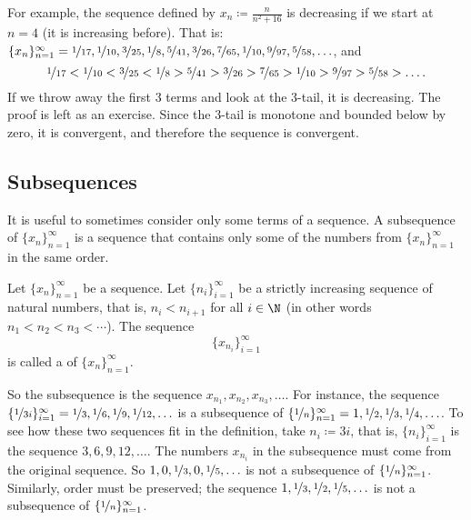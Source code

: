 For example, the sequence defined by $x_n \coloneqq \frac{n}{n^2+16}$ is decreasing
if we start at $n=4$ (it is increasing before).  That is:
$\{ x_n \}_{n=1}^\infty =
\nicefrac{1}{17},
\nicefrac{1}{10},
\nicefrac{3}{25},
\nicefrac{1}{8},
\nicefrac{5}{41},
\nicefrac{3}{26},
\nicefrac{7}{65},
\nicefrac{1}{10},
\nicefrac{9}{97},
\nicefrac{5}{58},\ldots$, and 
\begin{equation*}
\nicefrac{1}{17} <
\nicefrac{1}{10} <
\nicefrac{3}{25} <
\nicefrac{1}{8} >
\nicefrac{5}{41} >
\nicefrac{3}{26} >
\nicefrac{7}{65} >
\nicefrac{1}{10} >
\nicefrac{9}{97} >
\nicefrac{5}{58} > \ldots .
\end{equation*}
If we throw away the first 3 terms
and look at the 3-tail, it is decreasing.  The proof is left as an exercise.  Since the 3-tail
is monotone and bounded below by zero, it is convergent, and therefore the sequence is convergent.

\subsection{Subsequences}

It is useful to sometimes consider only some terms of a sequence.
A subsequence of $\{ x_n \}_{n=1}^\infty$ is a sequence that contains
only some of the numbers from $\{ x_n \}_{n=1}^\infty$ in the same order.

\begin{defn}
Let $\{ x_n \}_{n=1}^\infty$ be a sequence.
Let $\{ n_i \}_{i=1}^\infty$ be a strictly increasing sequence of natural
numbers, that is, $n_i < n_{i+1}$ for all $i \in \N$ (in other words $n_1 < n_2 < n_3 < \cdots$).  
The sequence
\begin{equation*}
\{ x_{n_i} \}_{i=1}^\infty
\end{equation*}
is called 
a \emph{} of $\{ x_n \}_{n=1}^\infty$.
\end{defn}

So the subsequence is the sequence $x_{n_1},x_{n_2},x_{n_3},\ldots$.
For instance,
the sequence
$\{ \nicefrac{1}{3i} \}_{i=1}^\infty
= \nicefrac{1}{3},\nicefrac{1}{6},\nicefrac{1}{9},\nicefrac{1}{12},\ldots$
is a subsequence of
$\{ \nicefrac{1}{n} \}_{n=1}^\infty
= 1, \nicefrac{1}{2},\nicefrac{1}{3},\nicefrac{1}{4},\ldots$.
To see how these two
sequences fit in the definition, take $n_i \coloneqq 3i$,
that is, $\{ n_i \}_{i=1}^\infty$ is the
sequence $3,6,9,12,\ldots$.  
The numbers $x_{n_i}$ in the
subsequence must come from the original sequence.  So $1,0,\nicefrac{1}{3},0,
\nicefrac{1}{5},\ldots$
is not a subsequence of $\{ \nicefrac{1}{n} \}_{n=1}^\infty$.  Similarly, order
must be preserved;
the sequence $1,\nicefrac{1}{3},\nicefrac{1}{2},\nicefrac{1}{5},\ldots$
is not a subsequence of $\{ \nicefrac{1}{n} \}_{n=1}^\infty$.

